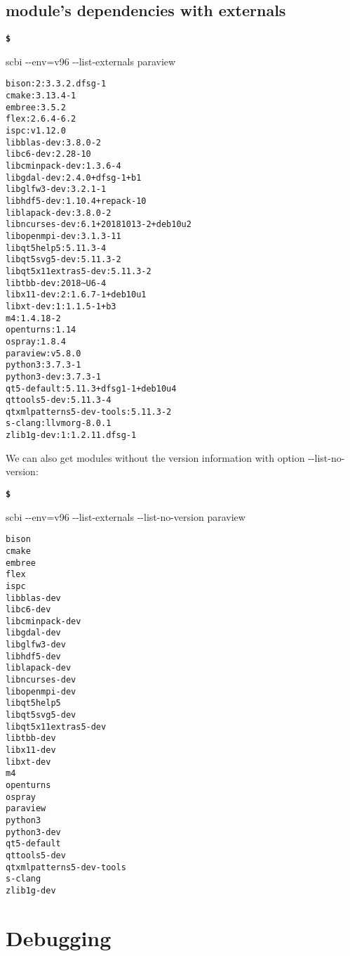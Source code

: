 \documentclass[a4paper,12pt,twoside]{article}
\newenvironment{shellcommand}{
	\begin{list}{ %
			\bfseries\texttt \$
		}{ %
			\ttfamily
			\setlength{\topsep}{-0.3ex}
			\setlength{\labelwidth}{1in}
			\setlength{\leftmargin}{0.7in}
			\setlength{\labelsep}{0.5ex}
			\setlength{\rightmargin}{0.5in}
			\setlength{\itemsep}{1ex}
			\setlength{\parsep}{0ex}
			\setlength{\listparindent}{0.5in}
		}
	}{
	\end{list}
}
\newcommand{\ddash}{-{}-}
\let\stdsection\section
\renewcommand\section{\newpage\stdsection}
\begin{document}
\subsection{module's dependencies with externals}

\begin{shellcommand}
	\item scbi \ddash{}env=v96 \ddash{}list-externals paraview
\end{shellcommand}

\begin{lstlisting}
bison:2:3.3.2.dfsg-1
cmake:3.13.4-1
embree:3.5.2
flex:2.6.4-6.2
ispc:v1.12.0
libblas-dev:3.8.0-2
libc6-dev:2.28-10
libcminpack-dev:1.3.6-4
libgdal-dev:2.4.0+dfsg-1+b1
libglfw3-dev:3.2.1-1
libhdf5-dev:1.10.4+repack-10
liblapack-dev:3.8.0-2
libncurses-dev:6.1+20181013-2+deb10u2
libopenmpi-dev:3.1.3-11
libqt5help5:5.11.3-4
libqt5svg5-dev:5.11.3-2
libqt5x11extras5-dev:5.11.3-2
libtbb-dev:2018~U6-4
libx11-dev:2:1.6.7-1+deb10u1
libxt-dev:1:1.1.5-1+b3
m4:1.4.18-2
openturns:1.14
ospray:1.8.4
paraview:v5.8.0
python3:3.7.3-1
python3-dev:3.7.3-1
qt5-default:5.11.3+dfsg1-1+deb10u4
qttools5-dev:5.11.3-4
qtxmlpatterns5-dev-tools:5.11.3-2
s-clang:llvmorg-8.0.1
zlib1g-dev:1:1.2.11.dfsg-1
\end{lstlisting}

We can also get modules without the version information with option \ddash{}list-no-version:

\begin{shellcommand}
	\item scbi \ddash{}env=v96 \ddash{}list-externals \ddash{}list-no-version paraview
\end{shellcommand}

\begin{lstlisting}
bison
cmake
embree
flex
ispc
libblas-dev
libc6-dev
libcminpack-dev
libgdal-dev
libglfw3-dev
libhdf5-dev
liblapack-dev
libncurses-dev
libopenmpi-dev
libqt5help5
libqt5svg5-dev
libqt5x11extras5-dev
libtbb-dev
libx11-dev
libxt-dev
m4
openturns
ospray
paraview
python3
python3-dev
qt5-default
qttools5-dev
qtxmlpatterns5-dev-tools
s-clang
zlib1g-dev
\end{lstlisting}


\section{Debugging}
\label{debugging}
\end{document}
